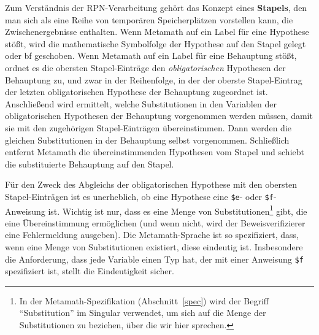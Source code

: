 Zum Verständnis der RPN-Verarbeitung gehört das Konzept eines {\bf Stapels}, den man sich als eine Reihe von temporären Speicherplätzen vorstellen kann, die Zwischenergebnisse enthalten.  Wenn Metamath auf ein Label für eine Hypothese stößt, wird die mathematische Symbolfolge der Hypothese auf den Stapel gelegt oder {bf geschoben}.  Wenn Metamath auf ein Label für eine Behauptung stößt, ordnet es die obersten Stapel-Einträge den {\em obligatorischen} Hypothesen der Behauptung zu, und zwar in der Reihenfolge, in der der oberste Stapel-Eintrag der letzten obligatorischen Hypothese der Behauptung zugeordnet ist.  Anschließend wird ermittelt, welche Substitutionen in den Variablen der obligatorischen Hypothesen der Behauptung vorgenommen werden müssen, damit sie mit den zugehörigen Stapel-Einträgen übereinstimmen.  Dann werden die gleichen Substitutionen in der Behauptung selbst vorgenommen.  Schließlich entfernt Metamath die übereinstimmenden Hypothesen vom Stapel und schiebt die substituierte Behauptung auf den Stapel.

Für den Zweck des Abgleichs der obligatorischen Hypothese mit den obersten Stapel-Einträgen ist es unerheblich, ob eine Hypothese eine \texttt{\$e}- oder \texttt{\$f}-Anweisung ist.  Wichtig ist nur, dass es eine Menge von Substitutionen\footnote{In der Metamath-Spezifikation (Abschnitt~\ref{spec}) wird der Begriff "`Substitution"' im Singular verwendet, um sich auf die Menge der Substitutionen zu beziehen, über die wir hier sprechen.} gibt, die eine Übereinstimmung ermöglichen (und wenn nicht, wird der Beweisverifizierer eine Fehlermeldung ausgeben).  Die Metamath-Sprache ist so spezifiziert, dass, wenn eine Menge von Substitutionen existiert, diese eindeutig ist. Insbesondere die Anforderung, dass jede Variable einen Typ hat, der mit einer Anweisung \texttt{\$f} spezifiziert ist, stellt die Eindeutigkeit sicher.

